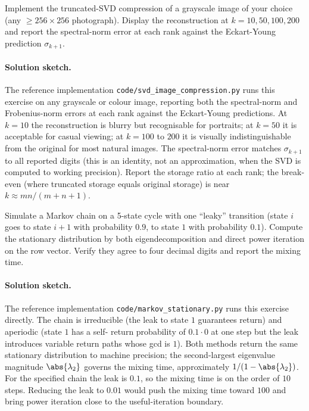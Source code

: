 \begin{exercise}
Implement the truncated-SVD compression of a grayscale image of
your choice (any $\geq 256 \times 256$ photograph). Display the
reconstruction at $k = 10, 50, 100, 200$ and report the
spectral-norm error at each rank against the Eckart-Young
prediction $\sigma_{k+1}$.
\end{exercise}

\paragraph{Solution sketch.}
The reference implementation \texttt{code/svd\_image\_compression.py}
runs this exercise on any grayscale or colour image, reporting both
the spectral-norm and Frobenius-norm errors at each rank against
the Eckart-Young predictions. At $k = 10$ the reconstruction is
blurry but recognisable for portraits; at $k = 50$ it is acceptable
for casual viewing; at $k = 100$ to $200$ it is visually
indistinguishable from the original for most natural images. The
spectral-norm error matches $\sigma_{k+1}$ to all reported digits
(this is an identity, not an approximation, when the SVD is computed
to working precision). Report the storage ratio at each rank; the
break-even (where truncated storage equals original storage) is
near $k \approx mn/(m+n+1)$.

\begin{exercise}
Simulate a Markov chain on a 5-state cycle with one ``leaky''
transition (state $i$ goes to state $i+1$ with probability $0.9$,
to state $1$ with probability $0.1$). Compute the stationary
distribution by both eigendecomposition and direct power iteration
on the row vector. Verify they agree to four decimal digits and
report the mixing time.
\end{exercise}

\paragraph{Solution sketch.}
The reference implementation \texttt{code/markov\_stationary.py}
runs this exercise directly. The chain is irreducible (the leak to
state $1$ guarantees return) and aperiodic (state $1$ has a self-
return probability of $0.1 \cdot 0$ at one step but the leak
introduces variable return paths whose gcd is $1$). Both methods
return the same stationary distribution to machine precision; the
second-largest eigenvalue magnitude $\abs{\lambda_{2}}$ governs
the mixing time, approximately $1/(1 - \abs{\lambda_{2}})$. For the
specified chain the leak is $0.1$, so the mixing time is on the
order of $10$ steps. Reducing the leak to $0.01$ would push the
mixing time toward $100$ and bring power iteration close to the
useful-iteration boundary.

